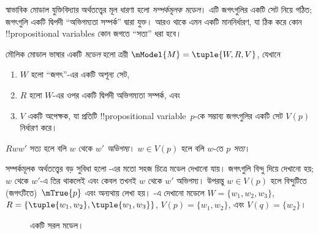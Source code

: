 \documentclass[../../../include/open-logic-section]{subfiles}
\begin{document}


স্বাভাবিক মোডাল যুক্তিবিদ্যার অর্থতত্ত্বের মূল ধারণা হলো \emph{সম্পর্কমূলক
মডেল}। এটি জগৎগুলির একটি সেট নিয়ে গঠিত; জগৎগুলি একটি দ্বিপদী
``অভিগম্যতা সম্পর্ক'' দ্বারা যুক্ত। আরও থাকে এমন একটি মাননির্ধারণ, যা
ঠিক করে কোন !!{propositional variable}s কোন জগতে ``সত্য'' ধরা হবে।

\begin{defn}
  মৌলিক মোডাল ভাষার একটি \emph{মডেল} হলো ত্রয়ী $\mModel{M}
  = \tuple{W, R, V}$, যেখানে
  \begin{enumerate}
  \item $W$ হলো ``জগৎ''-এর একটি অশূন্য সেট,
  \item $R$ হলো $W$-এর ওপর একটি দ্বিপদী অভিগম্যতা সম্পর্ক, এবং
  \item $V$ একটি অপেক্ষক, যা প্রতিটি !!{propositional
    variable}~$p$-কে সম্ভাব্য জগৎগুলির একটি সেট $V(p)$ নির্ধারণ করে।
  \end{enumerate}
  $Rww'$ সত্য হলে বলি $w$ থেকে $w'$ \emph{অভিগম্য}। $w \in V(p)$ হলে
  বলি $w$-তে $p$ \emph{সত্য}।
\end{defn}

সম্পর্কমূলক অর্থতত্ত্বের বড় সুবিধা হলো -এর মতো সহজ
চিত্রে মডেল দেখানো যায়। জগৎগুলি বিন্দু দিয়ে দেখানো হয়; $w$ থেকে
$w'$-এ তির থাকলেই এবং কেবল তখনই $w$ থেকে $w'$ অভিগম্য। উপরন্তু
$w \in V(p)$ হলে বিন্দুটিতে (জগৎটিতে)~$\mTrue{p}$ এবং অন্যথায়
 লেখা হয়। -এ দেখানো মডেলে
$W = \{w_1, w_2, w_3\}$, $R = \{\tuple{w_1, w_2},\tuple{w_1,
  w_3}\}$, $V(p) = \{w_1, w_2\}$, এবং $V(q) = \{w_2\}$।

\begin{figure}
  \begin{center}
  \end{center}
  \caption{একটি সরল মডেল।}
\end{figure}
\end{document}
